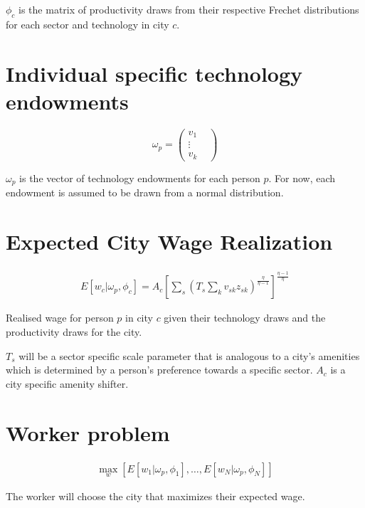 \documentclass[10pt]{article}
\begin{document}
$\phi_c$ is the matrix of productivity draws from their respective Frechet distributions for each sector and technology in city $c$.

\section{Individual specific technology endowments}

\begin{equation}
    \omega_p =
    \begin{pmatrix}
        v_{1}  & \\
        \vdots & \\
        v_{k}  &
    \end{pmatrix}
\end{equation}

$\omega_p$ is the vector of technology endowments for each person $p$. For now, each endowment is assumed to be drawn from a normal distribution.

\section{Expected City Wage Realization}

\begin{align}
    E[w_c | \omega_p, \phi_c] = A_c[\sum_{s}^{}(T_s \sum_{k}^{} v_{sk} z_{sk})^{\frac{\eta}{\eta - 1}}]^{\frac{\eta - 1}{\eta}}
\end{align}

Realised wage for person $p$ in city $c$ given their technology draws and the productivity draws for the city.

$T_s$ will be a sector specific scale parameter that is analogous to a city's amenities which is determined by a person's preference towards a specific sector. $A_c$ is a city specific amenity shifter.

\section{Worker problem}

\begin{align}
    \max_{w} [E[w_1 | \omega_p, \phi_1], \dots, E[w_N | \omega_p, \phi_N]]
\end{align}

The worker will choose the city that maximizes their expected wage.
\end{document}
